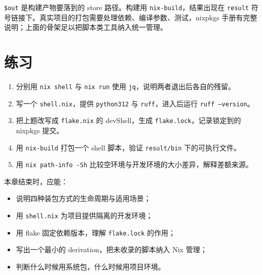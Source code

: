
\texttt{\$out} 是构建产物要落到的 store 路径。构建用 \texttt{nix-build}，结果出现在 \texttt{result} 符号链接下。真实项目的打包需要处理依赖、编译参数、测试，nixpkgs 手册有完整说明；上面的骨架足以把脚本类工具纳入统一管理。

\section{练习}

\begin{enumerate}
  \item 分别用 \texttt{nix shell} 与 \texttt{nix run} 使用 \texttt{jq}，说明两者退出后各自的残留。
  \item 写一个 \texttt{shell.nix}，提供 \texttt{python312} 与 \texttt{ruff}，进入后运行 \texttt{ruff --version}。
  \item 把上题改写成 \texttt{flake.nix} 的 devShell，生成 \texttt{flake.lock}，记录锁定到的 nixpkgs 提交。
  \item 用 \texttt{nix-build} 打包一个 shell 脚本，验证 \texttt{result/bin} 下的可执行文件。
  \item 用 \texttt{nix path-info -Sh} 比较空环境与开发环境的大小差异，解释差额来源。
\end{enumerate}

\begin{checkpoint}
本章结束时，应能：
\begin{itemize}
  \item 说明四种装包方式的生命周期与适用场景；
  \item 用 \texttt{shell.nix} 为项目提供隔离的开发环境；
  \item 用 flake 固定依赖版本，理解 \texttt{flake.lock} 的作用；
  \item 写出一个最小的 derivation，把未收录的脚本纳入 Nix 管理；
  \item 判断什么时候用系统包，什么时候用项目环境。
\end{itemize}
\end{checkpoint}
